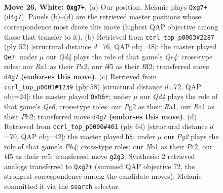 \documentclass[11pt]{article}
\begin{document}
\clearpage

\begin{figure}[p]\centering
\begin{subfigure}{0.46\textwidth}\centering
\resizebox{\linewidth}{!}{%
\newchessgame
\chessboard[
  setfen={1r5r/4k1pp/1p6/p4b2/3Q3P/8/PP3PP1/RN4K1 w - - 1 26},
  showmover=false,
  pgfstyle=straightmove, color=movearrow, markmove={d4-g7}
]}
\caption{}
\end{subfigure}\hfill
\begin{subfigure}{0.46\textwidth}\centering
\resizebox{\linewidth}{!}{%
\newchessgame
\chessboard[
  setfen={r5k1/ppp2p1p/3p3q/8/4Q3/8/P1P2RP1/6K1 w - - 0 27},
  showmover=false,
  pgfstyle=straightmove, color=movearrow, markmove={e4-e7}
]}
\caption{}
\end{subfigure}
\\[4pt]
\begin{subfigure}{0.46\textwidth}\centering
\resizebox{\linewidth}{!}{%
\newchessgame
\chessboard[
  setfen={r2r3k/p7/2p1Q2b/4P3/1p3pp1/8/PPK1B1q1/R7 w - - 0 30},
  showmover=false,
  pgfstyle=straightmove, color=movearrow, markmove={e6-h6}
]}
\caption{}
\end{subfigure}\hfill
\begin{subfigure}{0.46\textwidth}\centering
\resizebox{\linewidth}{!}{%
\newchessgame
\chessboard[
  setfen={r7/5kp1/b1p1p3/p1rpQ1P1/7P/8/PPP5/1K6 w - - 0 33},
  showmover=false,
  pgfstyle=straightmove, color=movearrow, markmove={h4-h5}
]}
\caption{}
\end{subfigure}
\caption{\textbf{Move 26, White: \texttt{Qxg7+}.} (a) Our position; Melanie plays \texttt{Qxg7+} (\texttt{d4g7}). Panels (b)--(d) are the retrieved master positions whose correspondence most drove this move (highest QAP objective among those that transfer to it). (b) Retrieved from \texttt{ccrl\_top\_p0003\#2287} (ply 52) [structural distance $d$=76, QAP obj=48]: the master played \texttt{Qe7}; under $\mu$ our \emph{Qd4} plays the role of that game's \emph{Qe4}; cross-type roles: our \emph{R}a1 as their \emph{P}a2, our \emph{b}f5 as their \emph{R}f2; transferred move \texttt{d4g7} \textbf{(endorses this move)}. (c) Retrieved from \texttt{ccrl\_top\_p0001\#1239} (ply 58) [structural distance $d$=72, QAP obj=24]: the master played \texttt{Qxh6+}; under $\mu$ our \emph{Qd4} plays the role of that game's \emph{Qe6}; cross-type roles: our \emph{P}g2 as their \emph{R}a1, our \emph{R}a1 as their \emph{P}b2; transferred move \texttt{d4g7} \textbf{(endorses this move)}. (d) Retrieved from \texttt{ccrl\_top\_p0000\#401} (ply 64) [structural distance $d$=70, QAP obj=42]: the master played \texttt{h5}; under $\mu$ our \emph{Pg2} plays the role of that game's \emph{Ph4}; cross-type roles: our \emph{N}b1 as their \emph{P}c2, our \emph{b}f5 as their \emph{r}c5; transferred move \texttt{g2g3}. Synthesis: 2 retrieved analogs transferred to \texttt{Qxg7+} (summed QAP objective 72, the strongest correspondence among the candidate moves); Melanie committed it via the \texttt{search} selector.}
\label{fig:thought-m50}
\end{figure}
\end{document}
